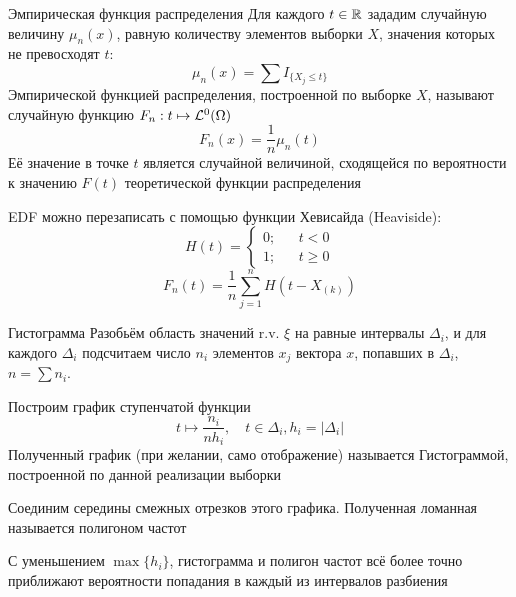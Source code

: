 \begin{dfn}{Эмпирическая функция распределения}
Для каждого $t\in\mathbb R$ зададим случайную величину $\mu_n(x)$,
равную количеству элементов выборки $X$,
значения которых не превосходят $t$:
$$\mu_n(x) = \sum I_{ \{ X_j \leq t \} }$$
Эмпирической функцией распределения, построенной по выборке $X$,
называют случайную функцию $F_n: t\mapsto \mathcal L^{0}(\Omega)$
$$F_n(x) = \frac{1}{n} \mu_n(t)$$
Её значение в точке $t$ является случайной величиной,
сходящейся по вероятности к значению $F(t)$
теоретической функции распределения

\begin{mbox}
EDF можно перезаписать с помощью функции Хевисайда (Heaviside):
\nopagebreak
$$H(t) =
\left\{\begin{aligned}
0; && t < 0 \\
1; && t \geq 0
\end{aligned}\right.$$
$$F_n(t) = \frac{1}{n} \sum_{j=1}^n H(t - X_{(k)})$$
\end{mbox}
\end{dfn}

\begin{dfn}{Гистограмма}
Разобьём область значений r.v. $\xi$ на равные интервалы $\Delta_i$,
и для каждого $\Delta_i$ подсчитаем число $n_i$ элементов $x_j$ вектора $x$,
попавших в $\Delta_i$, $n = \sum n_i$.

Построим график ступенчатой функции $$t\mapsto \frac{n_i}{n h_i},\quad t\in\Delta_i, h_i=|\Delta_i|$$
Полученный график (при желании, само отображение) называется Гистограммой,
построенной по данной реализации выборки

Соединим середины смежных отрезков этого графика.
Полученная ломанная называется полигоном частот

С уменьшением $\max\{h_i\}$,
гистограмма и полигон частот всё более точно приближают
вероятности попадания в каждый из интервалов разбиения
\end{dfn}
